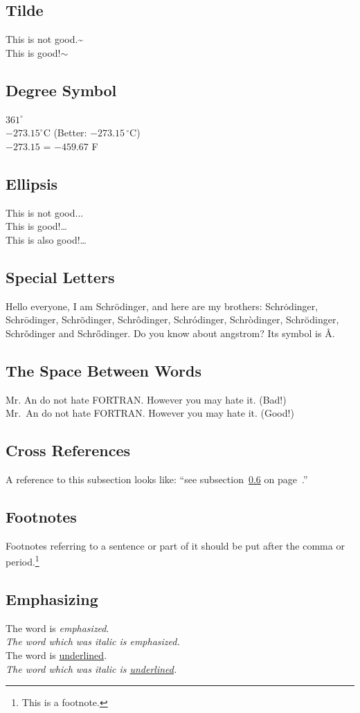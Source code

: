 \documentclass[a4paper,10pt]{article}
\begin{document}
    \subsection{Tilde}
    This is not good.\~{}\\
    This is good!$\sim$
    \subsection{Degree Symbol}
    $361^{\circ}$\\
    $-273.15^{\circ}\mathrm{C}$ (Better: $-273.15\,^{\circ}\mathrm{C}$)\\
    $-273.15$ \textcelsius{} = $-459.67$ \textdegree{}F
    \subsection{Ellipsis}
    This is not good...\\
    This is good!\dots{}\\
    This is also good!\ldots{}
    \subsection{Special Letters}
    Hello everyone, I am Schr\"{o}dinger, and here are my brothers:
    Schr\.{o}dinger, Schr\={o}dinger, Schr\~{o}dinger,
    Schr\^{o}dinger, Schr\'{o}dinger, Schr\`{o}dinger,
    Schr\u{o}dinger, Schr\v{o}dinger and Schr\H{o}dinger.
    Do you know about angstrom? Its symbol is \AA{}.
    \subsection{The Space Between Words}
    Mr. An do not hate FORTRAN. However you may hate it. (Bad!)\\
    Mr.~An do not hate FORTRAN\@. However you may hate it. (Good!)
    \subsection{Cross References}\label{ref}
    A reference to this subsection looks like:
    ``see subsection~\ref{ref} on page~\pageref{ref}.''
    \subsection{Footnotes}
    Footnotes referring to a sentence or part of it should be put
    after the comma or period.\footnote{This is a footnote.}
    \subsection{Emphasizing}
    The word is \emph{emphasized}.\\
    \textit{The word which was italic is \emph{emphasized}.}\\
    The word is \uline{underlined}.\\
    \textit{The word which was italic is \uline{underlined}.}
\end{document}
